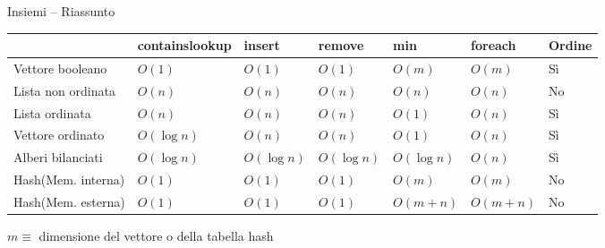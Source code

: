 \begin{frame}[shrink=20]{Insiemi -- Riassunto}
	
\renewcommand{\arraystretch}{1.3}

\begin{tabular}{|P{3.1cm}|P{1.5cm}|P{1.5cm}|P{1.5cm}|P{1.5cm}|P{1.7cm}|P{1.3cm}|}	
\hline
& \textsf{contains}\newline\textsf{lookup} & \textsf{insert} & \textsf{remove} & \textsf{min} & \textsf{foreach} & Ordine \\
\hline
Vettore booleano & $O(1)$ & $O(1)$ & $O(1)$ & $O(m)$ & $O(m)$ & Sì \\\hline
Lista non ordinata & $O(n)$ & $O(n)$ & $O(n)$ & $O(n)$ & $O(n)$ & No\\\hline
Lista ordinata & $O(n)$ & $O(n)$ & $O(n)$ & $O(1)$ & $O(n)$ & Sì\\\hline
Vettore ordinato & $O(\log n)$ & $O(n)$ & $O(n)$ & $O(1)$ & $O(n)$ & Sì\\\hline
Alberi bilanciati & $O(\log n)$ & $O(\log n)$ & $O(\log n)$ & $O(\log n)$ & $O(n)$ & Sì \\\hline
Hash\newline (Mem. interna) & $O(1)$ & $O(1)$ & $O(1)$ & $O(m)$ & $O(m)$ & No\\\hline
Hash\newline (Mem. esterna) & $O(1)$ & $O(1)$ & $O(1)$ & $O(m+n)$ & $O(m+n)$ & No \\\hline
\end{tabular}
	
\bigskip
$m \equiv$ dimensione del vettore o della tabella hash
	
\end{frame}



